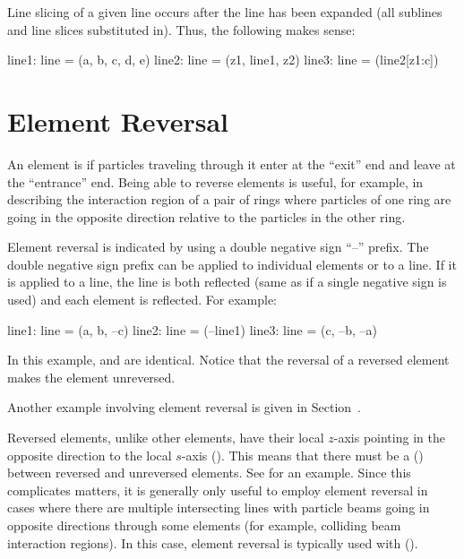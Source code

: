 Line slicing of a given line occurs after the line has been expanded (all sublines and line slices
substituted in). Thus, the following makes sense:
\begin{example}
  line1: line = (a, b, c, d, e)
  line2: line = (z1, line1, z2)
  line3: line = (line2[z1:c])
\end{example}

\section{Element Reversal}
\label{s:ele.reverse}

An element is  if particles traveling through it enter at the ``exit'' end and leave at
the ``entrance'' end. Being able to reverse elements is useful, for example, in describing the
interaction region of a pair of rings where particles of one ring are going in the opposite
direction relative to the particles in the other ring.

Element reversal is indicated by using a double negative sign ``--'' prefix. The double negative sign
prefix can be applied to individual elements or to a line. If it is applied to a line, the line is
both reflected (same as if a single negative sign is used) and each element is reflected. For
example:
\begin{example}
  line1: line = (a, b, --c)
  line2: line = (--line1)
  line3: line = (c, --b, --a)
\end{example}
In this example,  and  are identical. Notice that the reversal of a reversed
element makes the element unreversed.

Another example involving element reversal is given in Section~.

Reversed elements, unlike other elements, have their local $z$-axis pointing in the
opposite direction to the local $s$-axis (). This means that there
must be a  () between reversed and unreversed
elements. See  for an example. Since this complicates matters, it is
generally only useful to employ element reversal in cases where there are multiple
intersecting lines with particle beams going in opposite directions through some elements
(for example, colliding beam interaction regions). In this case, element reversal is
typically used with  ().

